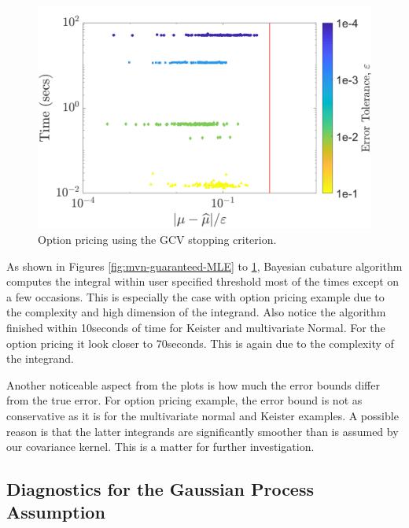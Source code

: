 \documentclass[twocolumn]{svjour3}          %
\begin{document}
\begin{figure}
	\centering
	\includegraphics[width=0.95\linewidth]{"optPrice_guaranteed_time_GCV_Baker_d12_r1_2018-Sep-6"}
	\caption[OptPrice guaranteed : GCV]{Option pricing using the  GCV stopping criterion.}
	\label{fig:optprice-guaranteed-GCV}
\end{figure}


As shown in Figures \ref{fig:mvn-guaranteed-MLE} to \ref{fig:optprice-guaranteed-GCV}, Bayesian cubature algorithm computes the integral within  user specified threshold most of the times except on a few occasions. This is especially the case with option pricing example due to the complexity and high dimension of the integrand. 
Also notice the algorithm finished within 10seconds of time for Keister and multivariate Normal. For the option pricing it look closer to 70seconds. This is again due to the complexity of the integrand.

Another noticeable aspect from the plots is how much the error bounds differ from the true error. For option pricing example, the error bound is not as conservative as it is for the multivariate normal and Keister examples. A possible reason is that the latter integrands are significantly smoother than is assumed by our covariance kernel.  This is a matter for further investigation.


\iffalse
\subsection{Diagnostics for the Gaussian Process Assumption}
\end{document}
